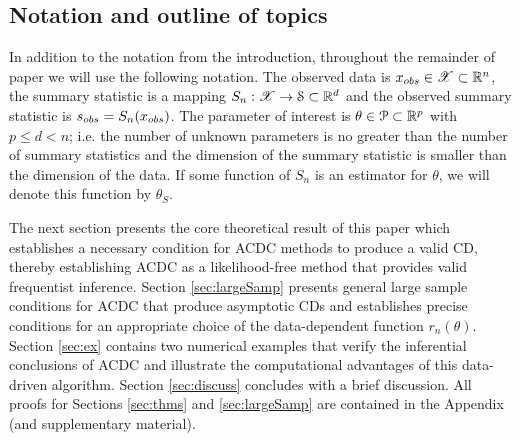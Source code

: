 	
\subsection{Notation and outline of topics}
In addition to the notation from the introduction, throughout the remainder of paper we will use the following notation. The observed data is $x_{\rm obs} \in \mathscr{X} \subset \mathbb{R}^n$, the summary statistic is a mapping $S_n: \mathscr{X} \rightarrow {\cal S} \subset \mathbb{R}^{d}$ and the observed summary statistic is $s_{\rm obs} = S_n(x_{\rm obs})$. The parameter of interest is $\theta \in \P \subset \mathbb{R}^p$ with $p \leq d < n$; i.e. the number of unknown parameters is no greater than the number of summary statistics and the dimension of the summary statistic is smaller than the dimension of the data. If some function of $S_n$ is an estimator for $\theta$, we will denote this function by $\hat{\theta}_S$. 


The next section presents the core theoretical result of this paper %
which establishes a necessary condition for ACDC methods to produce a valid CD, thereby %
establishing ACDC as a likelihood-free method that provides valid frequentist inference. 
Section \ref{sec:largeSamp} presents general large sample conditions for ACDC that produce asymptotic CDs and establishes precise conditions for an appropriate choice of the data-dependent function $r_n(\theta)$. Section \ref{sec:ex} contains two numerical examples that verify the inferential conclusions of ACDC and illustrate the computational advantages of this data-driven algorithm. Section \ref{sec:discuss} concludes with a brief discussion. All proofs for Sections \ref{sec:thms} and \ref{sec:largeSamp} are contained in the Appendix (and supplementary material). 


